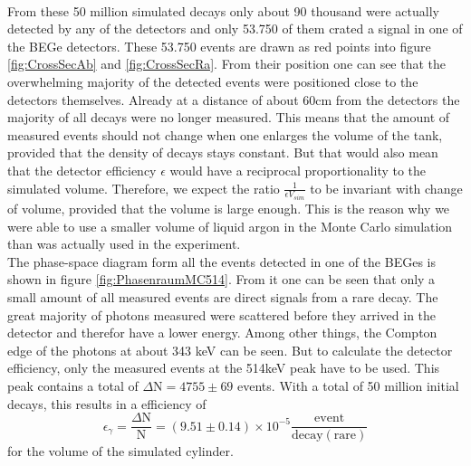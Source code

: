\\

From these 50 million simulated decays only about 90 thousand were actually detected by any of the detectors and only 53.750 of them crated a signal in one of the BEGe detectors.
These 53.750 events are drawn as red points into figure \ref{fig:CrossSecAb} and \ref{fig:CrossSecRa}.
From their position one can see that the overwhelming majority of the detected events were positioned close to the detectors themselves.
Already at a distance of about 60cm from the detectors the majority of all decays were no longer measured.
This means that the amount of measured events should not change when one enlarges the volume of the tank, provided that the density of decays stays constant.
But that would also mean that the detector efficiency $\epsilon$ would have a reciprocal proportionality to the simulated volume.
Therefore, we expect the ratio $\frac{1}{\epsilon V_{sim}}$ to be invariant with change of volume, provided that the volume is large enough.
This is the reason why we were able to use a smaller volume of liquid argon in the Monte Carlo simulation than was actually used in the experiment.
\\

The phase-space diagram form all the events detected in one of the BEGes is shown in figure \ref{fig:PhasenraumMC514}.
From it one can be seen that only a small amount of all measured events are direct signals from a rare  decay. 
The great majority of photons measured were scattered before they arrived in the detector and therefor have a lower energy.
Among other things, the Compton edge of the photons at about 343 keV can be seen.
But to calculate the detector efficiency, only the measured events at the 514keV peak have to be used.
This peak contains a total of \(\Delta\mathrm{N} = 4755\pm69\) events.
With a total of 50 million initial decays, this results in a efficiency of 
\begin{equation*}
\epsilon_{\gamma} = \frac{\Delta\mathrm{N}}{\mathrm{N}} = (9.51\pm0.14) \times 10^{-5}  \frac{\mathrm{event}}{\mathrm{decay(rare)}}
\end{equation*}
for the volume of the simulated cylinder.
\\

